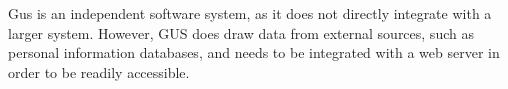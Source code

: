 		Gus is an independent software system, as it does not directly
		integrate with a larger system. However, GUS does draw data from
		external sources, such as personal information databases, and
		needs to be integrated with a web server in order to be readily
		accessible.